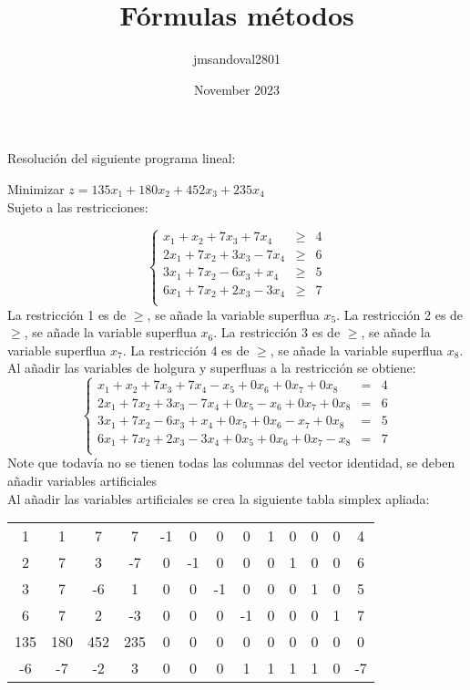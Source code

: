\documentclass{article} %
\title{Fórmulas métodos}
\author{jmsandoval2801 }
\date{November 2023}
\begin{document}
Resolución del siguiente programa lineal:
\begin{center}
Minimizar $z=135x_1+180x_2+452x_3+235x_4$ \\ 
Sujeto a las restricciones:
\end{center}
$$\left\{ 
 \begin{array}{rcl}
x_1+x_2+7x_3+7x_4 & \geq & 4\\ 
2x_1+7x_2+3x_3-7x_4 & \geq & 6\\ 
3x_1+7x_2-6x_3+x_4 & \geq & 5\\ 
6x_1+7x_2+2x_3-3x_4 & \geq & 7\\ 
\end{array} 
\right.$$
La restricción 1 es de $\geq$, se añade la variable superflua $x_5$. La restricción 2 es de $\geq$, se añade la variable superflua $x_6$. La restricción 3 es de $\geq$, se añade la variable superflua $x_7$. La restricción 4 es de $\geq$, se añade la variable superflua $x_8$. 
Al añadir las variables de holgura y superfluas a la restricción se obtiene:
$$\left\{ 
 \begin{array}{rcl}
x_1+x_2+7x_3+7x_4-x_5+0x_6+0x_7+0x_8 & = & 4\\ 
2x_1+7x_2+3x_3-7x_4+0x_5-x_6+0x_7+0x_8 & = & 6\\ 
3x_1+7x_2-6x_3+x_4+0x_5+0x_6-x_7+0x_8 & = & 5\\ 
6x_1+7x_2+2x_3-3x_4+0x_5+0x_6+0x_7-x_8 & = & 7\\ 
\end{array} 
\right.$$
Note que todavía no se tienen todas las columnas del vector identidad, se deben añadir variables artificiales \\ 
Al añadir las variables artificiales se crea la siguiente tabla simplex apliada:
\begin{center} 
\begin{tabular}{|cccccccccccc|c|}\hline
1 & 1 & 7 & 7 & -1 & 0 & 0 & 0 & 1 & 0 & 0 & 0 & 4  \\
2 & 7 & 3 & -7 & 0 & -1 & 0 & 0 & 0 & 1 & 0 & 0 & 6  \\
3 & 7 & -6 & 1 & 0 & 0 & -1 & 0 & 0 & 0 & 1 & 0 & 5  \\
6 & 7 & 2 & -3 & 0 & 0 & 0 & -1 & 0 & 0 & 0 & 1 & 7  \\
\hline
135 & 180 & 452 & 235 & 0 & 0 & 0 & 0 & 0 & 0 & 0 & 0 & 0  \\
-6 & -7 & -2 & 3 & 0 & 0 & 0 & 1 & 1 & 1 & 1 & 0 & -7  \\
\hline
\end{tabular}
\end{center}
\end{document}
